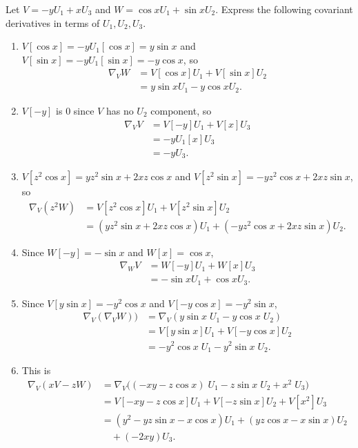 \documentclass[10pt]{report}
\begin{document}

\begin{exer}[2.5: 2]
	Let $V=-yU_1+xU_3$ and $W=\cos xU_1+\sin xU_2$. Express the following covariant derivatives in terms of $U_1,U_2,U_3$.
\end{exer}
\begin{enumerate}
	\item $V[\cos x] = -y U_1[\cos x] = y \sin x$ and $V[\sin x] = -y U_1[\sin x] = -y \cos x$, so \begin{align*}
			\nabla_{V}W &= V[\cos x]U_1 + V[\sin x]U_2 \\
				    &= y\sin x U_1 - y\cos x U_2.
	\end{align*}
\item $V[-y]$ is 0 since $V$ has no $U_2$ component, so
	\begin{align*}
		\nabla_{V}V &= V[-y] U_1 + V[x] U_3 \\
			    &= -y U_1[x] U_3 \\
			    &= -y U_3.
	\end{align*}

\item $V[z^2 \cos x] = yz^2 \sin x + 2xz \cos x$ and $V[z^2 \sin x] = -yz^2 \cos x + 2xz \sin x$, so
	\begin{align*}
		\nabla_{V}(z^2 W) &= V[z^2 \cos x] U_1 + V[z^2 \sin x] U_2 \\
				  &= (yz^2 \sin x + 2xz \cos x) U_1 + (-yz^2 \cos x + 2xz \sin x) U_2.
	\end{align*}
\item Since $W[-y] = -\sin x$ and $W[x] = \cos x$,
	\begin{align*}
		\nabla_{W}V &= W[-y]U_1 + W[x] U_3 \\
			    &= -\sin x U_1 + \cos x U_3.
	\end{align*}

\item Since $V[y\sin x]=-y^2\cos x$ and $V[-y\cos x] = -y^2\sin x$,
	\begin{align*}
		\nabla_{V}(\nabla_{V}W)) &= \nabla_{V}(y\sin x\;U_1-y\cos x\;U_2) \\
					 &=V[y\sin x]U_1 + V[-y\cos x]U_2 \\
					 &= -y^2\cos x\;U_1-y^2\sin x\;U_2.
	\end{align*}

	\item This is
		\begin{align*}
			\nabla_{V}(xV-zW) &= \nabla_{V}\big( (-xy-z\cos x)\;U_1-z\sin x\;U_2+x^2\;U_3 \big) \\
					  &= V[-xy-z\cos x]U_1+V[-z\sin x]U_2+V[x^2]U_3 \\
					  &= (y^2-yz\sin x-x\cos x)U_1+(yz\cos x-x\sin x)U_2\\&\quad+(-2xy)U_3.
		\end{align*}
\end{enumerate}
\pagebreak
\end{document}
